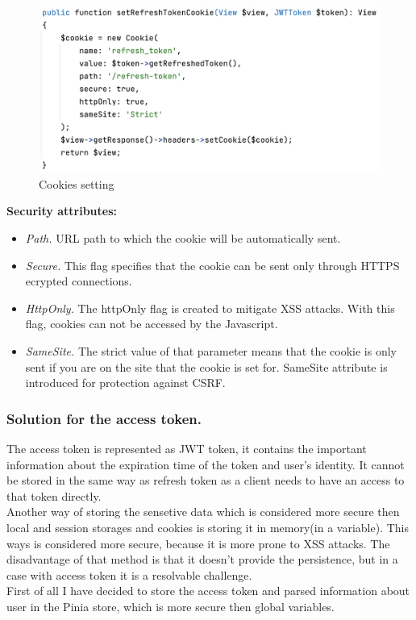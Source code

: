 \begin{figure}[h]
\centering
\includegraphics[scale=0.6]{../png/cookies.png}
\caption{Cookies setting}
\end{figure}

\noindent \textbf{Security attributes:}

\begin{itemize}
    \item \emph{Path.} URL path to which the cookie will be automatically sent.
    \item \emph{Secure.} This flag specifies that the cookie can be sent only through HTTPS ecrypted connections.
    \item \emph{HttpOnly.} The httpOnly flag is created to mitigate XSS attacks. With this flag, cookies can not be accessed by the Javascript.
    \item \emph{SameSite.} The strict value of that parameter means that the cookie is only sent if you are on the site that the cookie is set for. SameSite attribute is introduced for protection against CSRF. 
\end{itemize}



\subsubsection{Solution for the access token.} The access token is represented as JWT token, it contains the important information about the expiration time of the token and user's identity. It cannot be stored in the same way as refresh token as a client needs to have an access to that token directly.\\
Another way of storing the sensetive data which is considered more secure then local and session storages and cookies is storing it in memory(in a variable). This ways is considered more secure, because it is more prone to XSS attacks. The disadvantage of that method is that it doesn't provide the persistence, but in a case with access token it is a resolvable challenge.\\
First of all I have decided to store the access token and parsed information about user in the Pinia store, which is more secure then global variables.

